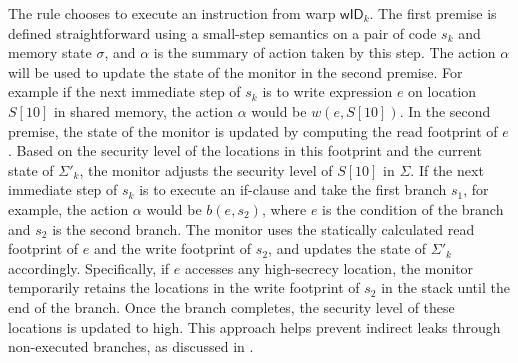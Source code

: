{\small\begin{mathpar}
\end{mathpar}
}
The rule chooses to execute an instruction from warp $\mathsf{wID}_k$. 
%
The first premise is defined straightforward using a small-step semantics on a pair of code $s_k$ and memory state $\sigma$, and $\alpha$ is the summary of action taken by this step.
%
The action $\alpha$ will be used to update the state of the monitor in the second premise.
%
For example if the next immediate step of $s_k$ is to write expression $e$ on location $S[10]$ in shared memory, the action $\alpha$ would be $w(e, S[10])$. In the second premise, the state of the monitor is updated by computing the read footprint of $e$. Based on the security level of the locations in this footprint and the current state of $\Sigma'_k$, the monitor adjusts the security level of $S[10]$ in $\Sigma$. 
%
If the next immediate step of $s_k$ is to execute an if-clause and take the first branch $s_1$, for example, the action $\alpha$ would be $b(e, s_2)$, where $e$ is the condition of the branch and $s_2$ is the second branch.
%
The monitor uses the statically calculated read footprint of $e$ and the write footprint of $s_2$, and updates the state of $\Sigma'_k$ accordingly.
%
Specifically, if $e$ accesses any high-secrecy location, the monitor temporarily retains the locations in the write footprint of $s_2$ in the stack until the end of the branch. Once the branch completes, the security level of these locations is updated to high.
%
This approach helps prevent indirect leaks through non-executed branches, as discussed in \cite{russo2010CSF}.


